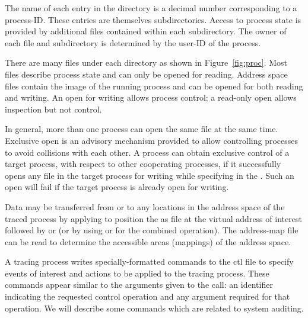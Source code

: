 The name of each entry in the 
directory is a decimal number corresponding to a process-ID. These entries are
themselves subdirectories. Access to process state is provided by additional
files contained within each subdirectory. The owner of each  file and
subdirectory is determined by the user-ID of the process.

There are many files under each  directory as shown in
Figure~\ref{fig:proc}. Most files describe process state and can only be opened
for reading. Address space files contain the image of the running process and
can be opened for both reading and writing. An open for writing allows process
control; a read-only open allows inspection but not control.

In general, more than one process can open the same  file at the
same time. Exclusive open is an advisory mechanism provided to allow
controlling processes to avoid collisions with each other. A process can obtain
exclusive control of a target process, with respect to other cooperating
processes, if it successfully opens any  file in the target process
for writing while specifying  in the . Such an open
will fail if the target process is already open for writing.

Data may be transferred from or to any locations in the address space of the
traced process by applying  to position the as file at the
virtual address of interest followed by  or  (or
by using  or  for the combined operation). The
address-map file  can be read to determine the accessible
areas (mappings) of the address space.

A tracing process writes specially-formatted commands to the ctl file to
specify events of interest and actions to be applied to the tracing process.
These commands appear similar to the arguments given to the  call: an
identifier indicating the requested control operation and any argument required
for that operation. We will describe some commands which are related to system
auditing.

